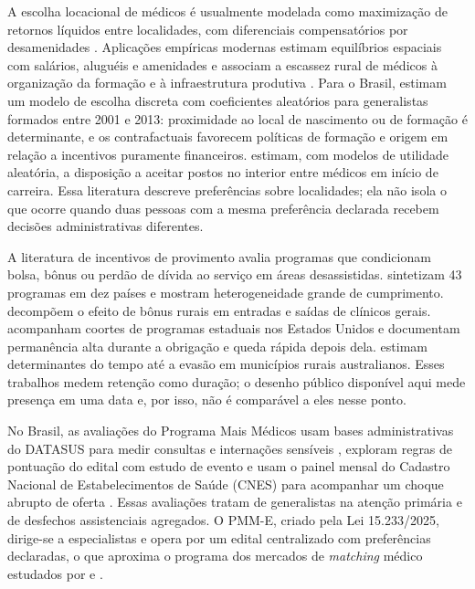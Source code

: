 \documentclass[11pt,a4paper]{article}
\begin{document}
A escolha locacional de médicos é usualmente modelada como maximização de
retornos líquidos entre localidades, com diferenciais compensatórios por
desamenidades \citep{roback1982}. Aplicações empíricas modernas estimam
equilíbrios espaciais com salários, aluguéis e amenidades \citep{diamond2016} e
associam a escassez rural de médicos à organização da formação e à
infraestrutura produtiva \citep{moehling2020}. Para o Brasil,
\citet{costa2024} estimam um modelo de escolha discreta com coeficientes
aleatórios para generalistas formados entre 2001 e 2013: proximidade ao local de
nascimento ou de formação é determinante, e os contrafactuais favorecem políticas
de formação e origem em relação a incentivos puramente financeiros.
\citet{sivey2012} estimam, com modelos de utilidade aleatória, a disposição a
aceitar postos no interior entre médicos em início de carreira. Essa literatura
descreve preferências sobre localidades; ela não isola o que ocorre quando duas
pessoas com a mesma preferência declarada recebem decisões administrativas
diferentes.

A literatura de incentivos de provimento avalia programas que condicionam bolsa,
bônus ou perdão de dívida ao serviço em áreas desassistidas.
\citet{barnighausen2009} sintetizam 43 programas em dez países e mostram
heterogeneidade grande de cumprimento. \citet{gravelle2018} decompõem o efeito
de bônus rurais em entradas e saídas de clínicos gerais. \citet{pathman2004}
acompanham coortes de programas estaduais nos Estados Unidos e documentam
permanência alta durante a obrigação e queda rápida depois dela.
\citet{russell2021} estimam determinantes do tempo até a evasão em municípios
rurais australianos. Esses trabalhos medem retenção como duração; o desenho
público disponível aqui mede presença em uma data e, por isso, não é comparável
a eles nesse ponto.

No Brasil, as avaliações do Programa Mais Médicos usam bases administrativas do
DATASUS para medir consultas e internações sensíveis \citep{fontes2018},
exploram regras de pontuação do edital com estudo de evento \citep{carrillo2019}
e usam o painel mensal do Cadastro Nacional de Estabelecimentos de Saúde (CNES)
para acompanhar um choque abrupto de oferta \citep{sliwa2024}. Essas avaliações
tratam de generalistas na atenção primária e de desfechos assistenciais
agregados. O PMM-E, criado pela Lei 15.233/2025, dirige-se a especialistas e
opera por um edital centralizado com preferências declaradas, o que aproxima o
programa dos mercados de \emph{matching} médico estudados por
\citet{roth1984} e \citet{agarwal2015}.
\end{document}
